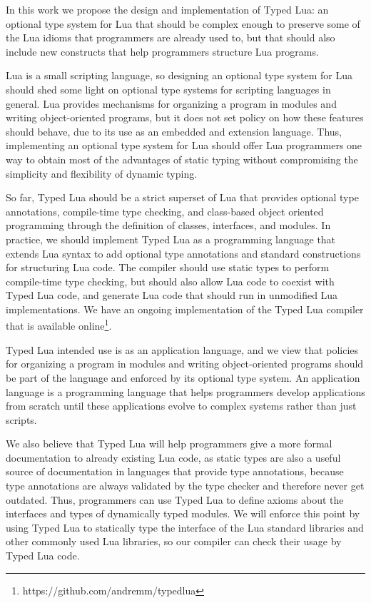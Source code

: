 \documentclass[preprint]{sig-alternate}
\begin{document}
In this work we propose the design and implementation of Typed Lua:
an optional type system for Lua that should be complex enough to
preserve some of the Lua idioms that programmers are already used to,
but that should also include new constructs that help programmers
structure Lua programs.

Lua is a small scripting language, so designing an optional type
system for Lua should shed some light on optional type systems for
scripting languages in general.
Lua provides mechanisms for organizing a program in modules and
writing object-oriented programs, but it does not set policy on how
these features should behave, due to its use as an embedded and
extension language.
Thus, implementing an optional type system for Lua should offer Lua
programmers one way to obtain most of the advantages of static typing
without compromising the simplicity and flexibility of dynamic typing.

So far, Typed Lua should be a strict superset of Lua that
provides optional type annotations, compile-time type checking, and
class-based object oriented programming through the definition of
classes, interfaces, and modules.
In practice, we should implement Typed Lua as a programming
language that extends Lua syntax to add optional type annotations
and standard constructions for structuring Lua code.
The compiler should use static types to perform compile-time type
checking, but should also allow Lua code to coexist with Typed Lua
code, and generate Lua code that should run in unmodified Lua
implementations.
We have an ongoing implementation of the Typed Lua compiler that is
available online\footnote{https://github.com/andremm/typedlua}.

Typed Lua intended use is as an application language, and we view
that policies for organizing a program in modules and writing
object-oriented programs should be part of the language and
enforced by its optional type system.
An application language is a programming language that helps
programmers develop applications from scratch until these
applications evolve to complex systems rather than just scripts.

We also believe that Typed Lua will help programmers give a more
formal documentation to already existing Lua code, as static types
are also a useful source of documentation in languages that provide
type annotations, because type annotations are always validated by
the type checker and therefore never get outdated.
Thus, programmers can use Typed Lua to define axioms about the
interfaces and types of dynamically typed modules.
We will enforce this point by using Typed Lua to statically type
the interface of the Lua standard libraries and other commonly used
Lua libraries, so our compiler can check their usage by Typed Lua
code.
\end{document}
